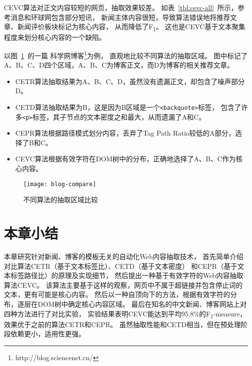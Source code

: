 CEVC算法对正文内容较短的网页，抽取效果较差。
如表~\ref{tbl:cevc-all}~所示，参考消息和环球网包含部分短讯，
新闻主体内容很短，导致算法错误地将推荐文章、新闻评价板块标记为核心内容，
从而降低了F\textsubscript{1}。
这也是CEVC基于文本聚集程度来划分核心内容的一个缺陷。

以图~\ref{fig:blog-compare}~的一篇
科学网博客\footnote{http://blog.sciencenet.cn/}为例，
直观地比较不同算法的抽取区域。
图中标记了A、B、C、D四个区域，A、B、C为博客正文，而D为博客的相关推荐文章。
\begin{itemize}
\item CETR算法抽取结果为A、B、C、D，虽然没有遗漏正文，却包含了噪声部分D。
\item CETD算法抽取结果为B，这是因为B区域是一个\texttt{<backquote>}标签，
包含了许多\texttt{<p>}标签，其子节点的文本密度之和最大，从而遗漏了A和C。
\item CEPR算法根据路径模式划分内容，丢弃了Tag Path Ratio较低的A部分，选择了B和C。
\item CEVC算法根据有效字符在DOM树中的分布，正确地选择了A、B、C作为核心内容。
\end{itemize}

\begin{figure}[htbp]
\centering
\texttt{[image: blog-compare]}
\caption{不同算法的抽取区域比较}
\label{fig:blog-compare}
\end{figure}

\section{本章小结}
\label{sec:cevc-conclusion}

本章研究针对新闻、博客的模板无关的自动化Web内容抽取技术，
首先简单介绍对比算法CETR（基于文本标签比）、CETD（基于文本密度）
和CEPR（基于文本标签路径比）的原理及实现细节，
然后提出一种基于有效字符的Web内容抽取算法CEVC。
该算法主要基于这样的观察，网页中不属于超链接并包含停止词的文本，更有可能是核心内容。
然后以一种自顶向下的方法，根据有效字符的分布，逐层在DOM树中确定核心内容区域。
最后在知名的中文新闻、博客网站上对四种方法进行了对比实验，
实验结果表明CEVC能达到平均95.8\%的F\textsubscript{1}-measure，
效果优于之前的算法CETR和CEPR。
虽然抽取性能和CETD相当，但在预处理阶段依赖更小，适用性更强。
